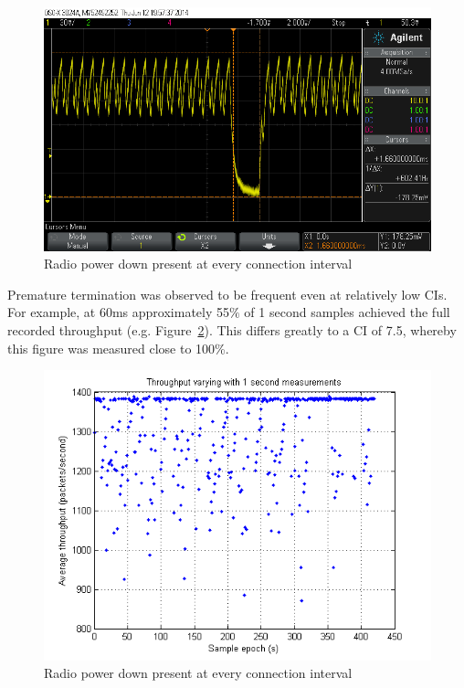 \documentclass[]{article}
\begin{document}
\begin{figure}[H]
	\begin{center}
		\includegraphics[width = \textwidth]{cilimit}
	\end{center}
	\caption{Radio power down present at every connection interval}
	\label{fig:cilimit}
\end{figure}

Premature termination was observed to be frequent even at relatively low \ac{CI}s. For example, at 60ms approximately 55$\%$ of 1 second samples achieved the full recorded throughput   (e.g. Figure~\ref{fig:60cithroughput}). This differs greatly to a \ac{CI} of 7.5, whereby this figure was measured close to 100\%. 

\begin{figure}[H]
	\begin{center}
		\includegraphics[width = \textwidth]{60cithroughput}
	\end{center}
	\caption{Radio power down present at every connection interval}
	\label{fig:60cithroughput}
\end{figure}
\end{document}

